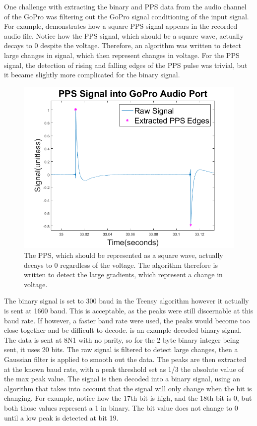 	One challenge with extracting the binary and PPS data from the audio channel of the GoPro was filtering out the GoPro signal conditioning of the input signal.  For example,  demonstrates how a square PPS signal appears in the recorded audio file.  Notice how the PPS signal, which should be a square wave, actually decays to 0 despite the voltage.  Therefore, an algorithm was written to detect large changes in signal, which then represent changes in voltage.  For the PPS signal, the detection of rising and falling edges of the PPS pulse was trivial, but it became slightly more complicated for the binary signal.
	\begin{figure}[H]
		\centering
		\includegraphics[scale = 0.7]{../figures/rawPPS.png}
		\caption{The PPS, which should be represented as a square wave, actually decays to 0 regardless of the voltage. The algorithm therefore is written to detect the large gradients, which represent a change in voltage.}
		\label{fig:rawPPS}
	\end{figure}
	The binary signal is set to 300 baud in the Teensy algorithm however it actually is sent at 1660 baud.  This is acceptable, as the peaks were still discernable at this baud rate.  If however, a faster baud rate were used, the peaks would become too close together and be difficult to decode.   is an example decoded binary signal.  The data is sent at 8N1 with no parity, so for the 2 byte binary integer being sent, it uses 20 bits.  The raw signal is filtered to detect large changes, then a Gaussian filter is applied to smooth out the data.  The peaks are then extracted at the known baud rate, with a peak threshold set as 1/3 the absolute value of the max peak value.  The signal is then decoded into a binary signal, using an algorithm that takes into account that the signal will only change when the bit is changing.  For example, notice how the 17th bit is high, and the 18th bit is 0, but both those values represent a 1 in binary.  The bit value does not change to 0 until a low peak is detected at bit 19.  
	
